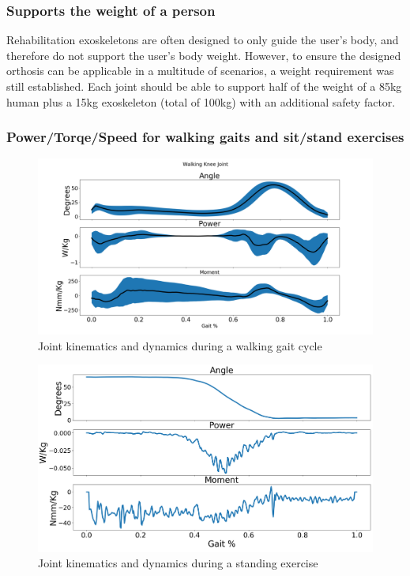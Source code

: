 \subsubsection{Supports the weight of a person}
 Rehabilitation exoskeletons are often designed to only guide the user's body, and therefore do not support the user's body weight. However, to ensure the designed orthosis can be applicable in a multitude of scenarios, a weight requirement was still established. Each joint should be able to support half of the weight of a 85kg human plus a 15kg exoskeleton (total of 100kg) with an additional safety factor.

\subsubsection{Power/Torqe/Speed for walking gaits and sit/stand exercises}

\begin{figure}[ht!]
    \centering
    \includegraphics[width=\linewidth]{Figures/Design/WalkingPowerCurveKnee.png}
    \caption{Joint kinematics and dynamics during a walking gait cycle \cite{SpringWrapClutchKnee}}
    \label{fig:WalkingPowerCurve}
\end{figure}

\begin{figure}[ht!]
    \centering
    \includegraphics[width=\linewidth]{Figures/Design/SitStandPowerCurveKnee.png}
    \caption{Joint kinematics and dynamics during a standing exercise \cite{SpringWrapClutchKnee}}
    \label{fig:SitStandPowerCurve}
\end{figure}

